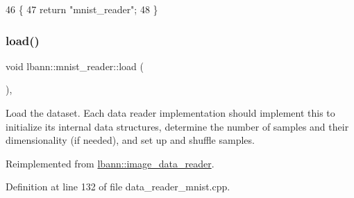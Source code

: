 \begin{DoxyCode}
46                                       \{
47     \textcolor{keywordflow}{return} \textcolor{stringliteral}{"mnist\_reader"};
48   \}
\end{DoxyCode}
\mbox{\label{classlbann_1_1mnist__reader_aacbd6c4dec95b9849083d96e0005b392}} 
\subsubsection{\texorpdfstring{load()}{load()}}
{\footnotesize\ttfamily void lbann\+::mnist\+\_\+reader\+::load (\begin{DoxyParamCaption}{ }\end{DoxyParamCaption})\hspace{0.3cm}{\ttfamily [override]}, {\ttfamily [virtual]}}

Load the dataset. Each data reader implementation should implement this to initialize its internal data structures, determine the number of samples and their dimensionality (if needed), and set up and shuffle samples. 

Reimplemented from \hyperlink{classlbann_1_1image__data__reader_a99cb80242d7d20bc1e8baeaff25ff790}{lbann\+::image\+\_\+data\+\_\+reader}.



Definition at line 132 of file data\+\_\+reader\+\_\+mnist.\+cpp.



